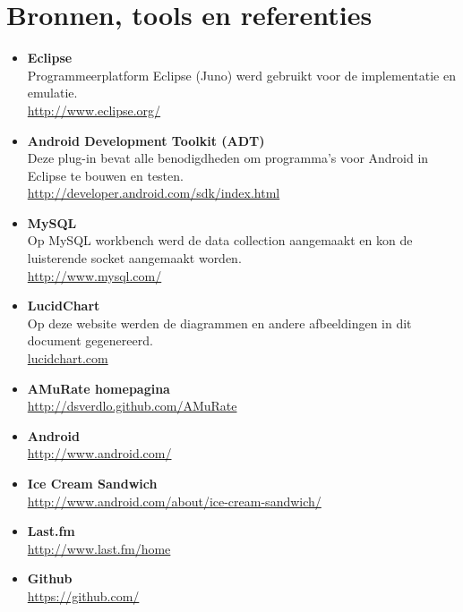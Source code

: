 \documentclass[11pt,a4paper]{article}
\begin{document}
\section{Bronnen, tools en referenties}
	\label{sec:Bronnen}

	\begin{itemize}
		
	\item \textbf{Eclipse} \\
	Programmeerplatform Eclipse (Juno) werd gebruikt voor de implementatie en emulatie.	\\
	\url{http://www.eclipse.org/}

	\item \textbf{Android Development Toolkit (ADT)} \\
	Deze plug-in bevat alle benodigdheden om programma's voor Android in Eclipse te bouwen en testen.\\
	\url{http://developer.android.com/sdk/index.html}
	
	\item \textbf{MySQL} \\
	Op MySQL workbench werd de data collection aangemaakt en kon de luisterende socket aangemaakt worden. \\
	\url{http://www.mysql.com/}	
	
	\item \textbf{LucidChart} \\
	Op deze website werden de diagrammen en andere afbeeldingen in dit document gegenereerd.\\
	\url{lucidchart.com}
	
	\item \textbf{AMuRate homepagina} \\
		\url{http://dsverdlo.github.com/AMuRate}
		
	\item \textbf{Android} \\
		\url{http://www.android.com/}
		
	\item \textbf{Ice Cream Sandwich} \\
		\url{http://www.android.com/about/ice-cream-sandwich/}	
		
	\item \textbf{Last.fm} \\
		\url{http://www.last.fm/home}	
		
	\item \textbf{Github} \\
		\url{https://github.com/}



	\end{itemize}
\end{document}

